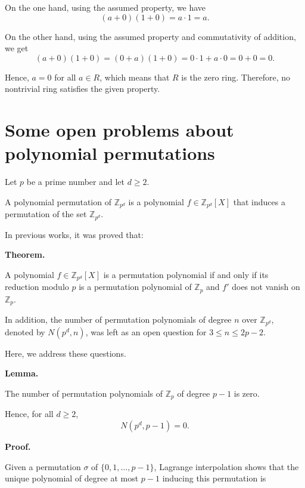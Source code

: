 \documentclass{article}
\begin{document}
On the one hand, using the assumed property, we have
\[
(a+0)(1+0) = a \cdot 1 = a.
\]

On the other hand, using the assumed property and commutativity of addition, we get
\[
(a+0)(1+0) = (0+a)(1+0) = 0 \cdot 1 + a \cdot 0 = 0 + 0 = 0.
\]

Hence, $a = 0$ for all $a \in R$, which means that $R$ is the zero ring. Therefore, no nontrivial ring satisfies the given property.

\section{Some open problems about polynomial permutations}

Let $p$ be a prime number and let $d \geq 2$.

A polynomial permutation of $\mathbb{Z}_{p^d}$ is a polynomial 
$f \in \mathbb{Z}_{p^d}[X]$ that induces a permutation of the set $\mathbb{Z}_{p^d}$.

In previous works, it was proved that:

\vspace{0.3cm}

\textbf{Theorem.} 

A polynomial $f \in \mathbb{Z}_{p^d}[X]$ is a permutation polynomial 
if and only if its reduction modulo $p$ is a permutation polynomial of $\mathbb{Z}_p$ 
and $f'$ does not vanish on $\mathbb{Z}_p$.

\vspace{0.3cm}

In addition, the number of permutation polynomials of degree $n$ over $\mathbb{Z}_{p^d}$, 
denoted by $N(p^d,n)$, was left as an open question 
for $3 \leq n \leq 2p-2$.

Here, we address these questions.

\vspace{0.3cm}

\textbf{Lemma.} 

The number of permutation polynomials of $\mathbb{Z}_p$ 
of degree $p-1$ is zero.

Hence, for all $d \geq 2$, 
\[
N(p^d,p-1) = 0.
\]

\vspace{0.3cm}

\textbf{Proof.}

Given a permutation $\sigma$ of $\{0,1,\dots,p-1\}$, 
Lagrange interpolation shows that the unique polynomial 
of degree at most $p-1$ inducing this permutation is
\end{document}
